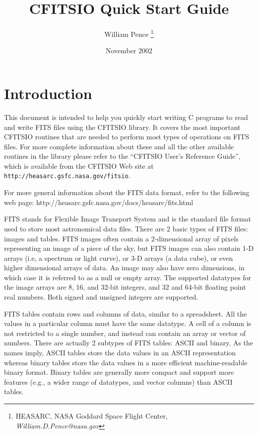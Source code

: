 \documentclass[11pt]{article}
\title{CFITSIO Quick Start Guide}
\author{William Pence \thanks{HEASARC, NASA Goddard Space Flight Center,
{\it William.D.Pence@nasa.gov}}}
\date{November 2002}
\begin{document}
\maketitle
\tableofcontents

\section{Introduction}

This document is intended to help you quickly start writing C programs
to read and write FITS files using the CFITSIO library.  It covers the
most important CFITSIO routines that are needed to perform most types
of operations on FITS files. For more complete information about these
and all the other available routines in the library please refer to
the  ``CFITSIO User's Reference Guide'', which is available from the
CFITSIO Web site at {\tt http://heasarc.gsfc.nasa.gov/fitsio}.

For more general information about the FITS data format, refer to the
following web page:
http://heasarc.gsfc.nasa.gov/docs/heasarc/fits.html

FITS stands for Flexible Image Transport System and is the standard
file format used to store most astronomical data files.  There are 2
basic types of FITS files: images and tables.  FITS images often
contain a 2-dimensional array of pixels representing an image of a
piece of the sky, but  FITS images can also contain 1-D arrays (i.e,
a spectrum or light curve), or  3-D arrays (a data cube), or
even higher dimensional arrays of data.   An image may also have zero
dimensions, in which case it is referred to as a null or empty array.
The supported datatypes for the image arrays are 8, 16, and 32-bit
integers, and 32 and 64-bit floating point real numbers.  Both signed
and unsigned integers are supported.

FITS tables contain rows and columns of data, similar to a
spreadsheet.  All the values in a particular column must have the same
datatype.  A cell of a column is not restricted to a single number, and
instead can contain an array or vector of numbers.  There are actually
2 subtypes of FITS tables: ASCII and binary. As the names imply,  ASCII
tables store the data values in an ASCII representation whereas binary
tables store the data values in a more efficient machine-readable
binary format.  Binary tables are generally more compact and support
more features (e.g., a wider range of datatypes, and vector columns)
than ASCII tables.
\end{document}

